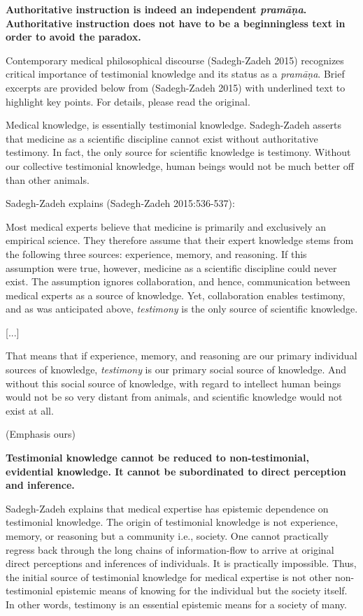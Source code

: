 {\bf Authoritative instruction is indeed an independent {{\sl\bfseries pramāṇa}\relax}.  Authoritative instruction does not have to be a beginningless text in order to avoid the paradox.}

\newpage

Contemporary medical philosophical discourse (Sadegh-Zadeh 2015) recognizes critical importance of testimonial knowledge and its status as a {\sl pramāṇa}.  Brief excerpts are provided below from (Sadegh-Zadeh 2015) with underlined text to highlight key points. For details, please read the original.
  
Medical knowledge, is essentially testimonial knowledge. Sadegh-Zadeh  asserts that medicine as a scientific discipline cannot exist without authoritative testimony. In fact, the only source for scientific knowledge is testimony. Without our collective testimonial knowledge, human beings would not be much better off than other animals.  

Sadegh-Zadeh explains (Sadegh-Zadeh 2015:536-537):
\begin{myquote}
Most medical experts believe that medicine is primarily and exclusively an empirical science.  They therefore assume that their expert knowledge stems from the following three sources: experience, memory, and reasoning. If this assumption were true, however, medicine as a scientific discipline could never exist. The assumption ignores collaboration, and hence, communication between medical experts as a source of knowledge. Yet, collaboration enables testimony, and as was anticipated above, {\sl testimony} is the only source of scientific knowledge.

[...]

That means that if experience, memory, and reasoning are our primary individual sources of knowledge, {\sl testimony} is our primary social source of knowledge.  And without this social source of knowledge, with regard to intellect human beings would not be so very distant from animals, and scientific knowledge would not exist at all.

\hfill (Emphasis ours)
\end{myquote}

{\bf Testimonial knowledge cannot be reduced to non-testimonial, evidential knowledge. It cannot be subordinated to direct perception and inference.}

Sadegh-Zadeh explains that medical expertise has epistemic dependence on testimonial knowledge.  The origin of testimonial knowledge is not experience, memory, or reasoning but a community i.e., society.  One cannot practically regress back through the long chains of information-flow to arrive at original direct perceptions and inferences of individuals.  It is practically impossible.  Thus, the initial source of testimonial knowledge for medical expertise is not other non-testimonial epistemic means of knowing for the individual but the society itself.  In other words, testimony is an essential epistemic means for a society of many.

